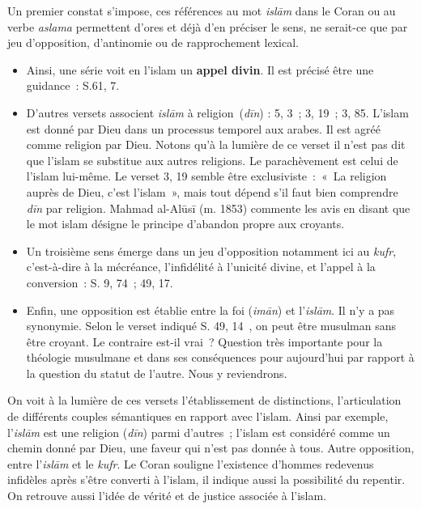 Un premier constat s'impose, ces références au mot \emph{islām} dans le
Coran ou au verbe \emph{aslama} permettent d'ores et déjà d'en préciser
le sens, ne serait-ce que par jeu d'opposition, d'antinomie ou de
rapprochement lexical.


\begin{itemize}
\item
  Ainsi, une série voit en l'islam un \textbf{appel divin}. Il est
  précisé être une guidance~: S.61, 7.
\item
  D'autres versets associent \emph{islām} à religion~(\emph{dīn}) : 5,
  3~; 3, 19~; 3, 85. L'islam est donné par Dieu dans un processus
  temporel aux arabes. Il est agréé comme religion par Dieu. Notons qu'à
  la lumière de ce verset il n'est pas dit que l'islam se substitue aux
  autres religions. Le parachèvement est celui de l'islam lui-même. Le
  verset 3, 19 semble être exclusiviste~:~«~La religion auprès de Dieu,
  c'est l'islam~», mais tout dépend s'il faut bien comprendre \emph{dīn}
  par religion. Mahmad al-Alūsī (m. 1853) commente les avis en disant
  que le mot islam désigne le principe d'abandon propre aux croyants.
\item
  Un troisième sens émerge dans un jeu d'opposition notamment ici au
  \emph{kufr}, c'est-à-dire à la mécréance, l'infidélité à l'unicité
  divine, et l'appel à la conversion~: S. 9, 74~; 49, 17.
\item
  Enfin, une opposition est établie entre la foi (\emph{imān}) et
  l'\emph{islām}. Il n'y a pas synonymie. Selon le verset indiqué S. 49,
  14~, on peut être musulman sans être croyant. Le contraire est-il
  vrai~? Question très importante pour la théologie musulmane et dans
  ses conséquences pour aujourd'hui par rapport à la question du statut
  de l'autre. Nous y reviendrons.
\end{itemize}

On voit à la lumière de ces versets l'établissement de distinctions,
l'articulation de différents couples sémantiques en rapport avec
l'islam. Ainsi par exemple, l'\emph{islām} est une religion (\emph{dīn})
parmi d'autres~; l'islam est considéré comme un chemin donné par Dieu,
une faveur qui n'est pas donnée à tous. Autre opposition, entre
l'\emph{islām} et le \emph{kufr}. Le Coran souligne l'existence d'hommes
redevenus infidèles après s'être converti à l'islam, il indique aussi la
possibilité du repentir. On retrouve aussi l'idée de vérité et de
justice associée à l'islam.


